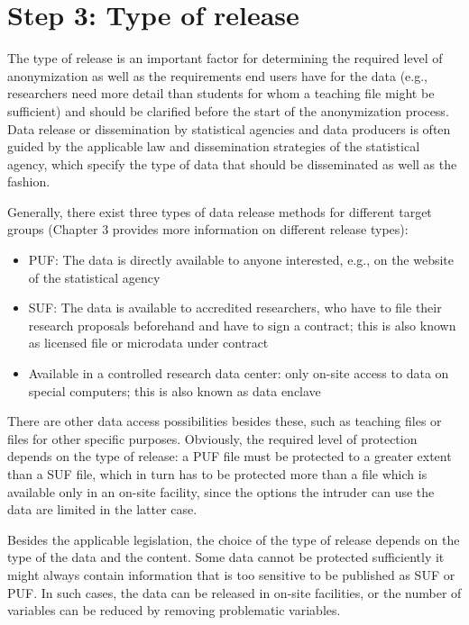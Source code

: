 \documentclass[letterpaper,10pt,english]{sphinxmanual}
\begin{document}
\section{Step 3: Type of release}
\label{\detokenize{process:step-3-type-of-release}}
The type of release is an important factor for determining the required
level of anonymization as well as the requirements end users have for
the data (e.g., researchers need more detail than students for whom a
teaching file might be sufficient) and should be clarified before the
start of the anonymization process. Data release or dissemination by
statistical agencies and data producers is often guided by the
applicable law and dissemination strategies of the statistical agency,
which specify the type of data that should be disseminated as well as
the fashion.

Generally, there exist three types of data release methods for different
target groups (Chapter 3 provides more information on different release
types):
\begin{itemize}
\item {} 
PUF: The data is directly available to anyone interested, e.g., on
the website of the statistical agency

\item {} 
SUF: The data is available to accredited researchers, who have to
file their research proposals beforehand and have to sign a contract;
this is also known as licensed file or microdata under contract

\item {} 
Available in a controlled research data center: only on-site access
to data on special computers; this is also known as data enclave

\end{itemize}

There are other data access possibilities besides these, such as
teaching files or files for other specific purposes. Obviously, the
required level of protection depends on the type of release: a PUF file
must be protected to a greater extent than a SUF file, which in turn has
to be protected more than a file which is available only in an on-site
facility, since the options the intruder can use the data are limited in
the latter case.

Besides the applicable legislation, the choice of the type of release
depends on the type of the data and the content.  Some data cannot be protected sufficiently \textendash{} it might always
contain information that is too sensitive to be published as SUF or PUF.
In such cases, the data can be released in on-site facilities, or the
number of variables can be reduced by removing problematic variables.
\end{document}

